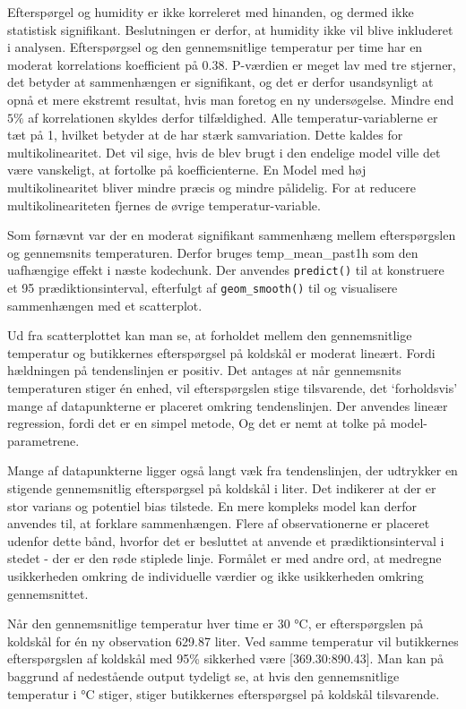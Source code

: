 \documentclass[
  12pt,
  a4paper,
  DIV=11,
  numbers=noendperiod,
  oneside,
  open=any]{scrartcl}
\begin{document}
Efterspørgel og humidity er ikke korreleret med hinanden, og dermed ikke
statistisk signifikant. Beslutningen er derfor, at humidity ikke vil
blive inkluderet i analysen. Efterspørgsel og den gennemsnitlige
temperatur per time har en moderat korrelations koefficient på 0.38.
P-værdien er meget lav med tre stjerner, det betyder at sammenhængen er
signifikant, og det er derfor usandsynligt at opnå et mere ekstremt
resultat, hvis man foretog en ny undersøgelse. Mindre end \(5\%\) af
korrelationen skyldes derfor tilfældighed. Alle temperatur-variablerne
er tæt på 1, hvilket betyder at de har stærk samvariation. Dette kaldes
for multikolinearitet. Det vil sige, hvis de blev brugt i den endelige
model ville det være vanskeligt, at fortolke på koefficienterne. En
Model med høj multikolinearitet bliver mindre præcis og mindre
pålidelig. For at reducere multikolineariteten fjernes de øvrige
temperatur-variable.

Som førnævnt var der en moderat signifikant sammenhæng mellem
efterspørgslen og gennemsnits temperaturen. Derfor bruges
temp\_mean\_past1h som den uafhængige effekt i næste kodechunk. Der
anvendes \texttt{predict()} til at konstruere et 95\(%
\) prædiktionsinterval, efterfulgt af \texttt{geom\_smooth()} til og
visualisere sammenhængen med et scatterplot.

Ud fra scatterplottet kan man se, at forholdet mellem den gennemsnitlige
temperatur og butikkernes efterspørgsel på koldskål er moderat lineært.
Fordi hældningen på tendenslinjen er positiv. Det antages at når
gennemsnits temperaturen stiger én enhed, vil efterspørgslen stige
tilsvarende, det `forholdsvis' mange af datapunkterne er placeret
omkring tendenslinjen. Der anvendes lineær regression, fordi det er en
simpel metode, Og det er nemt at tolke på model-parametrene.

Mange af datapunkterne ligger også langt væk fra tendenslinjen, der
udtrykker en stigende gennemsnitlig efterspørgsel på koldskål i liter.
Det indikerer at der er stor varians og potentiel bias tilstede. En mere
kompleks model kan derfor anvendes til, at forklare sammenhængen. Flere
af observationerne er placeret udenfor dette bånd, hvorfor det er
besluttet at anvende et prædiktionsinterval i stedet - der er den røde
stiplede linje. Formålet er med andre ord, at medregne usikkerheden
omkring de individuelle værdier og ikke usikkerheden omkring
gennemsnittet.

Når den gennemsnitlige temperatur hver time er 30 °C, er efterspørgslen
på koldskål for én ny observation 629.87 liter. Ved samme temperatur vil
butikkernes efterspørgslen af koldskål med 95\% sikkerhed være
{[}369.30:890.43{]}. Man kan på baggrund af nedestående output tydeligt
se, at hvis den gennemsnitlige temperatur i °C stiger, stiger
butikkernes efterspørgsel på koldskål tilsvarende.
\end{document}
